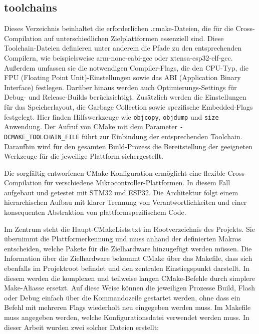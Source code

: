 \subsection*{toolchains}
Dieses Verzeichnis beinhaltet die erforderlichen .cmake-Dateien, die für die Cross-Compilation auf unterschiedlichen Zielplattformen essenziell sind.
Diese Toolchain-Dateien definieren unter anderem die Pfade zu den entsprechenden Compilern, wie beispielsweise arm-none-eabi-gcc oder xtensa-esp32-elf-gcc. 
Außerdem umfassen sie die notwendigen Compiler-Flags, die den CPU-Typ, die FPU (Floating Point Unit)-Einstellungen sowie das ABI (Application Binary Interface) festlegen. 
Darüber hinaus werden auch Optimierungs-Settings für Debug- und Release-Builds berücksichtigt. 
Zusätzlich werden die Einstellungen für das Speicherlayout, die Garbage Collection sowie spezifische Embedded-Flags festgelegt. 
Hier finden Hilfswerkzeuge wie \texttt{objcopy}, \texttt{objdump} und \texttt{size} Anwendung.
Der Aufruf von CMake mit dem Parameter \texttt{-DCMAKE\_TOOLCHAIN\_FILE} führt zur Einbindung der entsprechenden Toolchain. 
Daraufhin wird für den gesamten Build-Prozess die Bereitstellung der geeigneten Werkzeuge für die jeweilige Plattform sichergestellt.

\vspace{0.5cm}
\vspace{0.5cm}

Die sorgfältig entworfenen CMake-Konfiguration ermöglicht eine flexible Cross-Compilation für verschiedene Mikrocontroller-Plattformen.
In diesem Fall aufgebaut und getestet mit STM32 und ESP32. 
Die Architektur folgt einem hierarchischen Aufbau mit klarer Trennung von Verantwortlichkeiten und einer konsequenten Abstraktion von plattformspezifischem Code.

Im Zentrum steht die Haupt-CMakeLists.txt im Rootverzeichnis des Projekts. 
Sie übernimmt die Plattformerkennung und muss anhand der definierten Makros entscheiden, welche Pakete für die Zielhardware hinzugefügt werden müssen. 
Die Information über die Zielhardware bekommt CMake über das Makefile, dass sich ebenfalls im Projektroot befindet und den zentralen Einstiegspunkt darstellt.
In diesem werden die komplexen und teilweise langen CMake-Befehle durch simplere Make-Aliasse ersetzt.
Auf diese Weise können die jeweiligen Prozesse Build, Flash oder Debug einfach über die Kommandozeile gestartet werden, ohne dass ein Befehl mit mehreren Flags wiederholt neu eingegeben werden muss. 
Im Makefile muss angegeben werden, welche Konfigurationsdatei verwendet werden muss.
In dieser Arbeit wurden zwei solcher Dateien erstellt:

